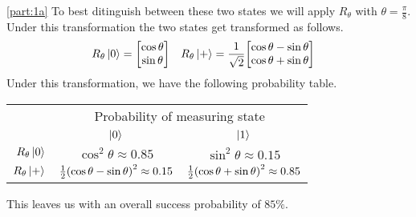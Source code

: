 \documentclass[boxes]{homework}
\begin{document}
\begin{solution}
	\ref{part:1a}
	To best ditinguish between these two states we will apply $R_\theta$ with $\theta = \frac{\pi}{8}$. Under this transformation the two states get transformed as follows.
	\begin{align*}
		R_{\theta}\ket{0} &= \mqty[\cos\theta \\ \sin\theta] & R_{\theta}\ket{+} &= \frac{1}{\sqrt{2}}\mqty[\cos\theta - \sin\theta \\ \cos\theta + \sin\theta]
	\end{align*}
	Under this transformation, we have the following probability table.
	\begin{center}
		\begin{tabular}{ r | c | c }
			& \multicolumn{2}{c}{Probability of measuring state} \\
			                  & $\ket{0}$                                                & $\ket{1}$                                                \\ \midrule
			$R_\theta\ket{0}$ & $\cos^2\theta\approx 0.85$                               & $\sin^2\theta\approx 0.15$                               \\
			$R_\theta\ket{+}$ & $\frac{1}{2}\qty(\cos\theta - \sin\theta)^2\approx 0.15$ & $\frac{1}{2}\qty(\cos\theta + \sin\theta)^2\approx 0.85$
		\end{tabular}
	\end{center}
	This leaves us with an overall success probability of $85\%$.


\end{solution}
\end{document}
